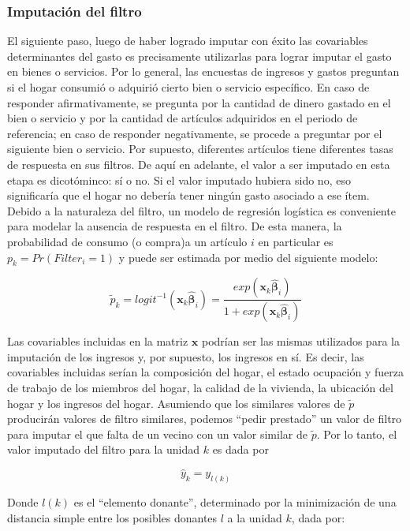 \documentclass[12pt,spanish,]{book}
\begin{document}
\hypertarget{imputacion-del-filtro}{%
\subsubsection*{Imputación del filtro}\label{imputacion-del-filtro}}

El siguiente paso, luego de haber logrado imputar con éxito las covariables determinantes del gasto es precisamente utilizarlas para lograr imputar el gasto en bienes o servicios. Por lo general, las encuestas de ingresos y gastos preguntan si el hogar consumió o adquirió cierto bien o servicio específico. En caso de responder afirmativamente, se pregunta por la cantidad de dinero gastado en el bien o servicio y por la cantidad de artículos adquiridos en el periodo de referencia; en caso de responder negativamente, se procede a preguntar por el siguiente bien o servicio. Por supuesto, diferentes artículos tiene diferentes tasas de respuesta en sus filtros. De aquí en adelante, el valor a ser imputado en esta etapa es dicotóminco: sí o no. Si el valor imputado hubiera sido no, eso significaría que el hogar no debería tener ningún gasto asociado a ese ítem. Debido a la naturaleza del filtro, un modelo de regresión logística es conveniente para modelar la ausencia de respuesta en el filtro. De esta manera, la probabilidad de consumo (o compra)a un artículo \(i\) en particular es \(p_k = Pr(Filter_i = 1)\) y puede ser estimada por medio del siguiente modelo:

\[
\tilde{p}_k = logit^{-1}(\mathbf{x}_k \hat{\boldsymbol{\beta}}_i) =
\frac{exp(\mathbf{x}_k \hat{\boldsymbol{\beta}}_i)}{1+exp(\mathbf{x}_k \hat{\boldsymbol{\beta}}_i)}
\]

Las covariables incluidas en la matriz \(\mathbf{x}\) podrían ser las mismas utilizados para la imputación de los ingresos y, por supuesto, los ingresos en sí. Es decir, las covariables incluidas serían la composición del hogar, el estado ocupación y fuerza de trabajo de los miembros del hogar, la calidad de la vivienda, la ubicación del hogar y los ingresos del hogar. Asumiendo que los similares valores de \(\tilde p\) producirán valores de filtro similares, podemos ``pedir prestado'' un valor de filtro para imputar el que falta de un vecino con un valor similar de \(\tilde p\). Por lo tanto, el valor imputado del filtro para la unidad \(k\) es dada por

\[\hat{y}_k = y_{l(k)}\]

Donde \(l(k)\) es el ``elemento donante'', determinado por la minimización de una distancia simple entre los posibles donantes \(l\) a la unidad \(k\), dada por:
\end{document}
